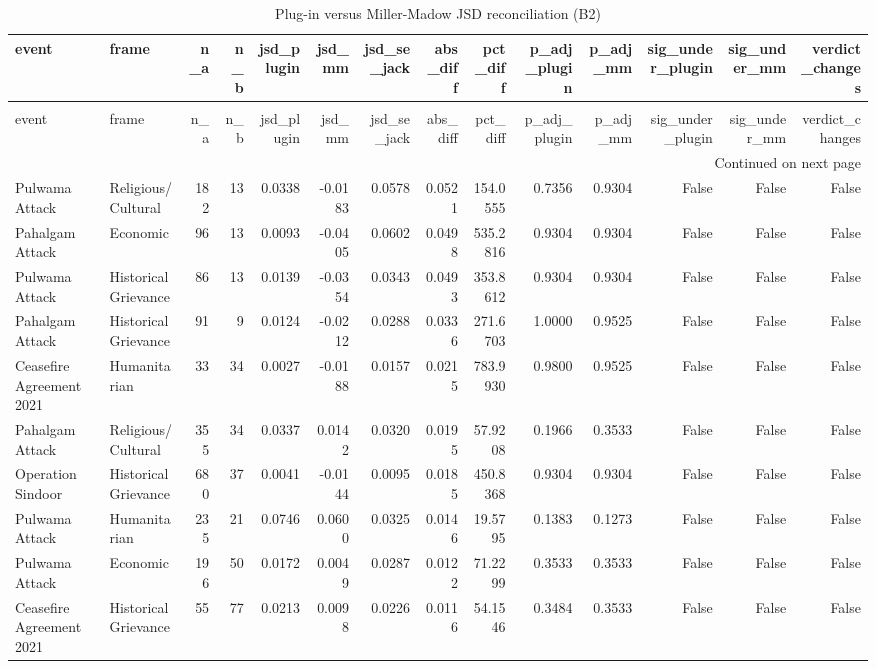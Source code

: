 \begin{longtable}{llrrrrrrrrrrrr}
\caption{Plug-in versus Miller-Madow JSD reconciliation (B2)} \label{tab:r1r2_jsd_plugin_vs_mm} \\
\toprule
event & frame & n\_a & n\_b & jsd\_plugin & jsd\_mm & jsd\_se\_jack & abs\_diff & pct\_diff & p\_adj\_plugin & p\_adj\_mm & sig\_under\_plugin & sig\_under\_mm & verdict\_changes \\
\midrule
\endfirsthead
\caption[]{Plug-in versus Miller-Madow JSD reconciliation (B2)} \\
\toprule
event & frame & n\_a & n\_b & jsd\_plugin & jsd\_mm & jsd\_se\_jack & abs\_diff & pct\_diff & p\_adj\_plugin & p\_adj\_mm & sig\_under\_plugin & sig\_under\_mm & verdict\_changes \\
\midrule
\endhead
\midrule
\multicolumn{14}{r}{Continued on next page} \\
\midrule
\endfoot
\bottomrule
\endlastfoot
Pulwama Attack & Religious/Cultural & 182 & 13 & 0.0338 & -0.0183 & 0.0578 & 0.0521 & 154.0555 & 0.7356 & 0.9304 & False & False & False \\
Pahalgam Attack & Economic & 96 & 13 & 0.0093 & -0.0405 & 0.0602 & 0.0498 & 535.2816 & 0.9304 & 0.9304 & False & False & False \\
Pulwama Attack & Historical Grievance & 86 & 13 & 0.0139 & -0.0354 & 0.0343 & 0.0493 & 353.8612 & 0.9304 & 0.9304 & False & False & False \\
Pahalgam Attack & Historical Grievance & 91 & 9 & 0.0124 & -0.0212 & 0.0288 & 0.0336 & 271.6703 & 1.0000 & 0.9525 & False & False & False \\
Ceasefire Agreement 2021 & Humanitarian & 33 & 34 & 0.0027 & -0.0188 & 0.0157 & 0.0215 & 783.9930 & 0.9800 & 0.9525 & False & False & False \\
Pahalgam Attack & Religious/Cultural & 355 & 34 & 0.0337 & 0.0142 & 0.0320 & 0.0195 & 57.9208 & 0.1966 & 0.3533 & False & False & False \\
Operation Sindoor & Historical Grievance & 680 & 37 & 0.0041 & -0.0144 & 0.0095 & 0.0185 & 450.8368 & 0.9304 & 0.9304 & False & False & False \\
Pulwama Attack & Humanitarian & 235 & 21 & 0.0746 & 0.0600 & 0.0325 & 0.0146 & 19.5795 & 0.1383 & 0.1273 & False & False & False \\
Pulwama Attack & Economic & 196 & 50 & 0.0172 & 0.0049 & 0.0287 & 0.0122 & 71.2299 & 0.3533 & 0.3533 & False & False & False \\
Ceasefire Agreement 2021 & Historical Grievance & 55 & 77 & 0.0213 & 0.0098 & 0.0226 & 0.0116 & 54.1546 & 0.3484 & 0.3533 & False & False & False \\

\end{longtable}
